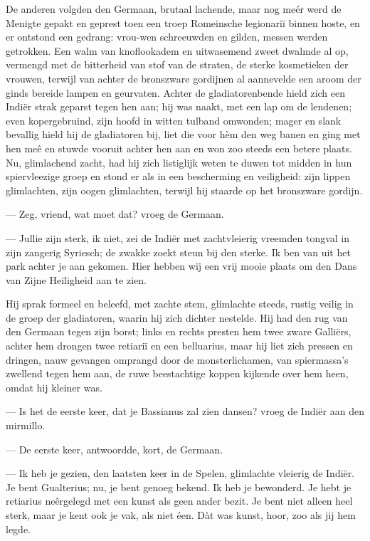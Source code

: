 \documentclass[a4paper, 12pt, oneside, dutch]{article}
\begin{document}
De anderen volgden den Germaan, brutaal lachende, maar nog meér werd de Menigte gepakt en geprest toen een troep Romeinsche legionariï binnen hoste, en er ontstond een gedrang: vrou-wen schreeuwden en gilden, messen werden getrokken. Een walm van knoflookadem en uitwasemend zweet dwalmde al op, vermengd met de bitterheid van stof van de straten, de sterke kosmetieken der vrouwen, terwijl van achter de bronszware gordijnen al aannevelde een aroom der ginds bereide lampen en geurvaten. Achter de gladiatorenbende hield zich een Indiër strak geparst tegen hen aan; hij was naakt, met een lap om de lendenen; even kopergebruind, zijn hoofd in witten tulband omwonden; mager en slank bevallig hield hij de gladiatoren bij, liet die voor hèm den weg banen en ging met hen meê en stuwde vooruit achter hen aan en won zoo steeds een betere plaats. Nu, glimlachend zacht, had hij zich listiglijk weten te duwen tot midden in hun spiervleezige groep en stond er als in een bescherming en veiligheid: zijn lippen glimlachten, zijn oogen glimlachten, terwijl hij staarde op het bronszware gordijn.

--- Zeg, vriend, wat moet dat? vroeg de Germaan.

--- Jullie zijn sterk, ik niet, zei de Indiër met zachtvleierig vreemden tongval in zijn zangerig Syriesch; de zwakke zoekt steun bij den sterke. Ik ben van uit het park achter je aan gekomen. Hier hebben wij een vrij mooie plaats om den Dans van Zijne Heiligheid aan te zien.

Hij sprak formeel en beleefd, met zachte stem, glimlachte steeds, rustig veilig in de groep der gladiatoren, waarin hij zich dichter nestelde. Hij had den rug van den Germaan tegen zijn borst; links en rechts presten hem twee zware Galliërs, achter hem drongen twee retiariï en een belluarius, maar hij liet zich pressen en dringen, nauw gevangen omprangd door de monsterlichamen, van spiermassa's zwellend tegen hem aan, de ruwe beestachtige koppen kijkende over hem heen, omdat hij kleiner was.

--- Is het de eerste keer, dat je Bassianus zal zien dansen? vroeg de Indiër aan den mirmillo.

--- De eerste keer, antwoordde, kort, de Germaan.

--- Ik heb je gezien, den laatsten keer in de Spelen, glimlachte vleierig de Indiër. Je bent Gualterius; nu, je bent genoeg bekend. Ik heb je bewonderd. Je hebt je retiarius neêrgelegd met een kunst als geen ander bezit. Je bent niet alleen heel sterk, maar je kent ook je vak, als niet éen. Dàt was kunst, hoor, zoo als jij hem legde.
\end{document}
